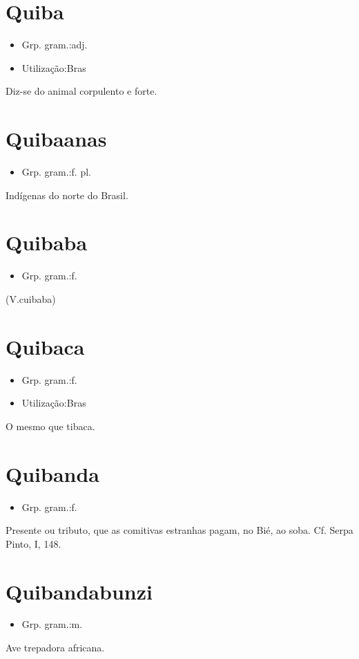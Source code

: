 \section{Quiba}
\begin{itemize}
\item {Grp. gram.:adj.}
\end{itemize}
\begin{itemize}
\item {Utilização:Bras}
\end{itemize}
Diz-se do animal corpulento e forte.
\section{Quibaanas}
\begin{itemize}
\item {Grp. gram.:f. pl.}
\end{itemize}
Indígenas do norte do Brasil.
\section{Quibaba}
\begin{itemize}
\item {Grp. gram.:f.}
\end{itemize}
(V.cuibaba)
\section{Quibaca}
\begin{itemize}
\item {Grp. gram.:f.}
\end{itemize}
\begin{itemize}
\item {Utilização:Bras}
\end{itemize}
O mesmo que \textunderscore tibaca\textunderscore .
\section{Quibanda}
\begin{itemize}
\item {Grp. gram.:f.}
\end{itemize}
Presente ou tributo, que as comitivas estranhas pagam, no Bié, ao soba. Cf. Serpa Pinto, I, 148.
\section{Quibandabunzi}
\begin{itemize}
\item {Grp. gram.:m.}
\end{itemize}
Ave trepadora africana.
